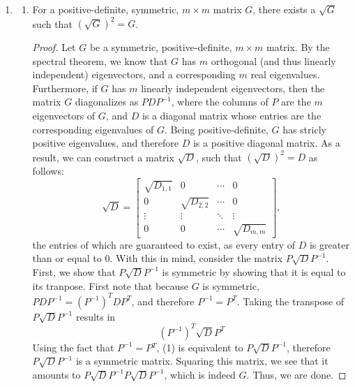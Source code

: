 \documentclass[12pt]{article}
\begin{document}
\begin{enumerate}[label=\Alph*.]
    \item
    \begin{enumerate}[label=\theenumi\Alph*]
        \item  For a positive-definite, symmetric, $m\times m$ matrix $G$, there exists a $\sqrt{G}$ such that $(\sqrt{G})^2 = G$.
            \begin{proof}
                Let $G$ be a symmetric, positive-definite, $m\times m$ matrix. By the spectral theorem, we know that
              $G$ has $m$ orthogonal (and thus linearly independent) eigenvectors, and a corresponding $m$ real eigenvalues.
              Furthermore, if $G$ has $m$ linearly independent eigenvectors, then the matrix $G$ diagonalizes as $PDP^{-1}$, where the columns
              of $P$ are the $m$ eigenvectors of $G$, and $D$ is a diagonal matrix whose entries are the corresponding eigenvalues of $G$. Being 
              positive-definite, $G$ has stricly positive eigenvalues, and therefore $D$ is a positive diagonal matrix. As a result,
              we can construct a matrix $\sqrt{D}$, such that $({\sqrt{D}})^2=D$ as follows:
              \begin{equation*}
              \sqrt{D}=\begin{bmatrix}
              \sqrt{D_{1,1}} & 0 & \cdots & 0 \\
              0 & \sqrt{D_{2,2}} & \cdots & 0 \\
              \vdots & \vdots & \ddots & \vdots \\
              0 & 0 & \cdots & \sqrt{D_{m,m}}
              \end{bmatrix},
              \end{equation*}
              the entries of which are guaranteed to exist, as every entry of $D$ is greater than or equal to 0.
              With this in mind, consider the matrix $P\sqrt{D}P^{-1}$. First, we show that $P\sqrt{D}P^{-1}$ is symmetric by showing
              that it is equal to its tranpose. First note that because $G$ is symmetric, $PDP^{-1}=(P^{-1})^TDP^T$, and therefore
              $P^{-1}=P^{T}$. Taking the transpose of $P\sqrt{D}P^{-1}$ results in 
              \begin{equation}
                (P^{-1})^T\sqrt{D}P^T
              \end{equation}
              Using the fact that $P^{-1}=P{^T}$, (1) is equivalent to $P\sqrt{D}P^{-1}$, therefore $P\sqrt{D}P^{-1}$ is a symmetric matrix.
              Squaring this matrix, we see that it amounts to $P\sqrt{D}P^{-1}P\sqrt{D}P^{-1}$, which is indeed $G$. Thus, we are done.
            \end{proof}
        



\end{enumerate}
\end{enumerate}
\end{document}

